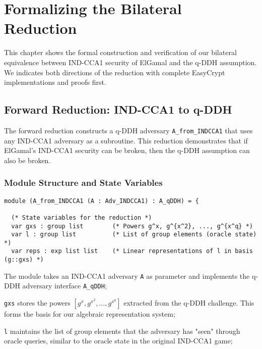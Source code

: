 \chapter{Formalizing the Bilateral Reduction}
\label{sec:bilateral-reduction}

This chapter shows the formal construction and verification of our bilateral equivalence between IND-CCA1 security of ElGamal and the q-DDH assumption. We indicates both directions of the reduction with complete EasyCrypt implementations and proofs first.

\section{Forward Reduction: IND-CCA1 to q-DDH}
\label{sec:forward-reduction4}

The forward reduction constructs a q-DDH adversary \texttt{A\_from\_INDCCA1} that uses any IND-CCA1 adversary as a subroutine. This reduction demonstrates that if ElGamal's IND-CCA1 security can be broken, then the q-DDH assumption can also be broken.

\subsection{Module Structure and State Variables}

\begin{lstlisting}[style=easycrypt, caption=A\_from\_INDCCA1 Module Structure, breaklines=true, breakatwhitespace=true, frame=single, keepspaces=true]
module (A_from_INDCCA1 (A : Adv_INDCCA1) : A_qDDH) = {
  
  (* State variables for the reduction *)
  var gxs : group list        (* Powers g^x, g^{x^2}, ..., g^{x^q} *)
  var l : group list          (* List of group elements (oracle state) *)
  var reps : exp list list    (* Linear representations of l in basis (g::gxs) *)
\end{lstlisting}

The module takes an IND-CCA1 adversary \texttt{A} as parameter and implements the q-DDH adversary interface \texttt{A\_qDDH};

\texttt{gxs} stores the powers $[g^x, g^{x^2}, \ldots, g^{x^q}]$ extracted from the q-DDH challenge. This forms the basis for our algebraic representation system;

\texttt{l} maintains the list of group elements that the adversary has "seen" through oracle queries, similar to the oracle state in the original IND-CCA1 game;

